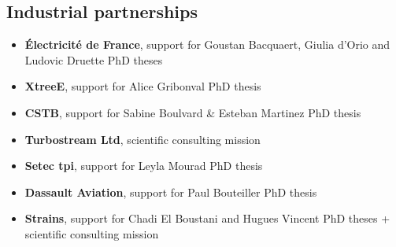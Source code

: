 \subsection*{\textcolor{navier_blue}{Industrial partnerships}}
\begin{itemize}[noitemsep,leftmargin=*]
\item[] \textbf{\'Electricité de France}, support for Goustan Bacquaert, Giulia d'Orio and Ludovic Druette PhD theses
\item[] \textbf{XtreeE}, support for Alice Gribonval PhD thesis
\item[] \textbf{CSTB}, support for Sabine Boulvard \& Esteban Martinez PhD thesis
\item[] \textbf{Turbostream Ltd}, scientific consulting mission
\item[] \textbf{Setec tpi}, support for Leyla Mourad PhD thesis
\item[] \textbf{Dassault Aviation}, support for Paul Bouteiller PhD thesis
\item[] \textbf{Strains}, support for Chadi El Boustani and Hugues Vincent PhD theses + scientific consulting mission
\end{itemize}

